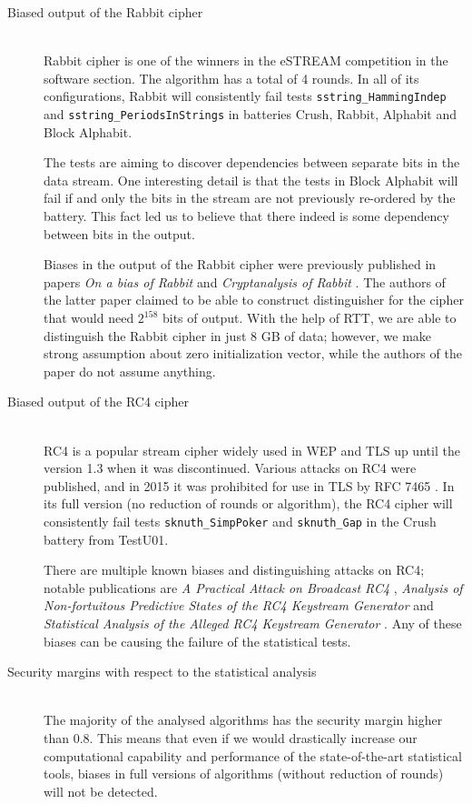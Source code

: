 \documentclass[
  digital,  	%
  color,		%
  oneside,   	%
  12pt,
  nocover,
  notable,
  nolof,
  nolot,
]{fithesis3}
\theoremstyle{definition}
\theoremstyle{remark}
\begin{document}
\begin{description}
\item[Biased output of the Rabbit cipher] \hfill \\
Rabbit \cite{rabbit} cipher is one of the winners in the eSTREAM competition in the software section. The algorithm has a total of 4 rounds. In all of its configurations, Rabbit will consistently fail tests \texttt{sstring\_HammingIndep} and \texttt{sstring\_PeriodsInStrings} in batteries Crush, Rabbit, Alphabit and Block Alphabit. 

The tests are aiming to discover dependencies between separate bits in the data stream. One interesting detail is that the tests in Block Alphabit will fail if and only the bits in the stream are not previously re-ordered by the battery. This fact led us to believe that there indeed is some dependency between bits in the output.

Biases in the output of the Rabbit cipher were previously published in papers \textit{On a bias of Rabbit} \cite{rabbit-bias-1} and \textit{Cryptanalysis of Rabbit} \cite{rabbit-bias-2}. The authors of the latter paper claimed to be able to construct distinguisher for the cipher that would need $2^{158}$ bits of output. With the help of RTT, we are able to distinguish the Rabbit cipher in just 8 GB of data; however, we make strong assumption about zero initialization vector, while the authors of the paper do not assume anything.

\item[Biased output of the RC4 cipher] \hfill \\
RC4 \cite{rc4} is a popular stream cipher widely used in WEP and TLS up until the version 1.3 when it was discontinued. Various attacks on RC4 were published, and in 2015 it was prohibited for use in TLS by RFC 7465 \cite{rfc7465}. In its full version (no reduction of rounds or algorithm), the RC4 cipher will consistently fail tests \texttt{sknuth\_SimpPoker} and \texttt{sknuth\_Gap} in the Crush battery from TestU01.

There are multiple known biases and distinguishing attacks on RC4; notable publications are \textit{A Practical Attack on Broadcast RC4} \cite{rc4-bias-1}, \textit{Analysis of Non-fortuitous Predictive States of the RC4 Keystream Generator} \cite{rc4-bias-2} and \textit{Statistical Analysis of the Alleged RC4 Keystream Generator} \cite{rc4-bias-3}. Any of these biases can be causing the failure of the statistical tests.

\item[Security margins with respect to the statistical analysis] \hfill \\
The majority of the analysed algorithms has the security margin higher than 0.8. This means that even if we would drastically increase our computational capability and performance of the state-of-the-art statistical tools, biases in full versions of algorithms (without reduction of rounds) will not be detected.


\end{description}
\end{document}
